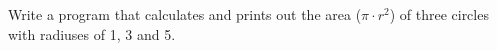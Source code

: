 Write a program that calculates and prints out the area ($\pi \cdot r^2$) of three circles with radiuses of 1, 3 and 5.
